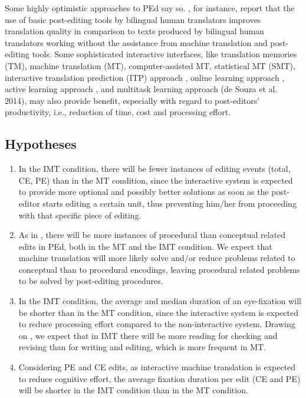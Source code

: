 \documentclass[output=paper]{langsci/langscibook}
\begin{document}
Some highly optimistic approaches to PEd say so. \citet{Green2013}, for instance, report that the use of basic post-editing tools by bilingual human translators improves translation quality in comparison to texts produced by bilingual human translators working without the assistance from machine translation and post-editing tools. Some sophisticated interactive interfaces, like translation memories (TM), machine translation (MT), computer-assisted MT, statistical MT (SMT), interactive translation prediction (ITP) approach \citep{langlais2002, casacuberta2009, Barrachina2009}, online learning approach \citep{OrtizMartinez2010}, active learning approach \citep{gonzalez2014cost}, and multitask learning approach (de Souza et al. 2014), may also provide benefit, especially with regard to post-editors' productivity, i.e., reduction of time, cost and processing effort.


\subsection{Hypotheses\label{alves:sec:Hypotheses}}

\begin{enumerate}
\item In the IMT condition, there will be fewer instances of editing events (total, CE, PE) than in the MT condition, since the interactive system is expected to provide more optional and possibly better solutions as soon as the post-editor starts editing a certain unit, thus preventing him/her from proceeding with that specific piece of editing.
\item As in \citet{alves2013}, there will be more instances of procedural than conceptual related edits in PEd, both in the MT and the IMT condition. We expect that machine translation will more likely solve and/or reduce problems related to conceptual than to procedural encodings, leaving procedural related problems to be solved by post-editing procedures.
\item In the IMT condition, the average and median duration of an eye-fixation will be shorter than in the MT condition, since the interactive system is expected to reduce processing effort compared to the non-interactive system. Drawing on \citet{jakobsen2008}, we expect that in IMT there will be more reading for checking and revising than for writing and editing, which is more frequent in MT.
\item Considering PE and CE edits, as interactive machine translation is expected to reduce cognitive effort, the average fixation duration per edit (CE and PE) will be shorter in the IMT condition than in the MT condition.
\end{enumerate}
\end{document}
